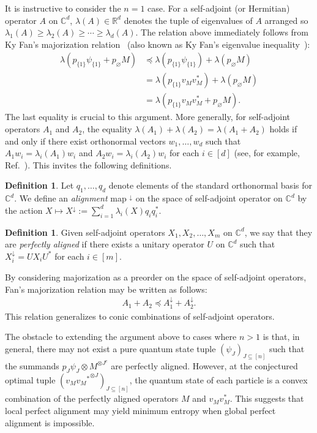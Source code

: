 \documentclass[12pt]{article}
\theoremstyle{definition}
\newtheorem{definition}[thm]{Definition}
\numberwithin{equation}{section}
\numberwithin{equation}{section}
\newcommand{\la}{\lambda}
\newcommand{\da}{\downarrow}
\newcommand{\varnot}{\varnothing}
\newcommand{\bC}{\mathbb{C}}
\newcommand{\bR}{\mathbb{R}}
\begin{document}
It is instructive to consider the \(n=1\) case.  For a self-adjoint (or Hermitian) operator \(A\) on \(\bC^d\), \(\la (A) \in \bR^d\)  denotes the tuple of eigenvalues of \(A\) arranged so \(\la_1 (A) \geq \la_2 (A) \geq \cdots \geq \la_d (A)\). The relation above immediately follows from Ky Fan's majorization relation~\cite{Fan1949} (also known as Ky Fan's eigenvalue inequality~\cite{Moslehian_2012}):
\begin{align}
\la(p_{\{1\}} \psi_{\{1\}} + p_{\varnot} M) &\preceq \la(p_{\{1\}} \psi_{\{1\}}) + \la(p_{\varnot} M)\\
&= \la(p_{\{1\}} v_M v_M^*) + \la(p_{\varnot} 
M)\\
&= \la(p_{\{1\}} v_M v_M^* + p_{\varnot} M).
\end{align}
The last equality is crucial to this argument. More generally, for self-adjoint operators \(A_1\) and \(A_2\), the equality \(\la(A_1) + \la(A_2) = \la(A_1 + A_2)\) holds if and only if there exist orthonormal vectors \(w_1, \ldots, w_{d}\) such that \(A_1 w_i = \la_i (A_1) w_i\) and \(A_2 w_i = \la_i (A_2) w_i\) for each \(i \in [d]\) (see, for example, Ref.~\cite{Niezgoda2022}). This invites the following definitions. 
\begin{definition}
\label{def: alignment map}
Let \(q_1, \ldots, q_d\) denote elements of the standard orthonormal basis for \(\bC^d\). We define an \textit{alignment} map \(^\da\) on the space of self-adjoint operator on \(\bC^d\) by the action \(X \mapsto X^\da :=  \sum_{i=1}^d \la_i (X) q_i q_i^*\).
\end{definition}
\begin{definition}
\label{def: perfect alignment}
Given self-adjoint operators \(X_1, X_2, \ldots, X_m\) on \(\bC^d\), we say that they are \textit{perfectly aligned} if there exists a unitary operator \(U\) on \(\bC^d\) such that \(X_i^{\da} = U X_i {U}^*\) for each \(i \in [m]\).
\end{definition}



By considering majorization as a preorder on the space of self-adjoint operators, Fan's majorization relation may be written as follows:
\begin{align}
\label{eq: Ky Fan majorization relation with da}
A_1 + A_2 \preceq A_1^\da + A_2^\da.
\end{align}
This relation generalizes to conic combinations of self-adjoint operators. 



The obstacle to extending the argument above to cases where \(n > 1\) is that, in general, there may not exist a pure quantum state tuple \((\psi_J)_{J \subseteq[n]}\) such that the summands \(p_{J}\psi_J \otimes M^{\otimes J^c}\) are perfectly aligned. However, at the conjectured optimal tuple \(({v_M {v_M}^*}^{\otimes J})_{J \subseteq[n]}\), the quantum state of each particle is a convex combination of the perfectly aligned operators \(M\) and \(v_M v_M^*\). This suggests that local perfect alignment may yield minimum entropy when global perfect alignment is impossible.  
\end{document}
